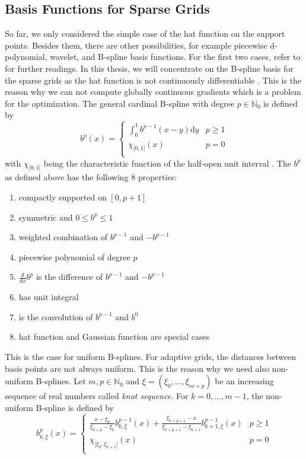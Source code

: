 \subsection{Basis Functions for Sparse Grids}

So far, we only considered the simple case of the hat function on the support points. Besides them, there are other possibilities, for example piecewise d-polynomial, wavelet, and B-spline basis functions. For the first two cases, refer to \cite{pfluger2010spatially, bungartz1998finite, bungartz2004sparse} for further readings. In this thesis, we will concentrate on the B-spline basis for the sparse grids as the hat function is not continuously differentiable \cite{b_splines}. This is the reason why we can not compute globally continuous gradients which is a problem for the optimization. The general cardinal B-spline with degree $ p \in \mathbb{N}_0 $ is defined by 
\begin{equation}
	b^p(x) = \begin{cases} 
				\int_0^1 b^{p-1}(x-y) \text{d}y				& p \geq 1 \\
				\chi_{[0,1[}(x) 							& p=0 \\
			\end{cases}
\end{equation}
with $ \chi_{[0,1[} $ being the characteristic function of the half-open unit interval \cite{hollig2013approximation}. The $ b^p $ as defined above has the following 8 properties:

\begin{enumerate}
	\item compactly supported on $ [0, p+1] $
	\item symmetric and $ 0 \le b^p \le 1 $
	\item weighted combination of $ b^{p-1} $ and $ -b^{p-1} $
	\item piecewise polynomial of degree $ p $
	\item $ \frac{d}{dx} b^p $ is the difference of $ b^{p-1} $ and $ -b^{p-1} $
	\item has unit integral 
	\item is the convolution of $ b^{p-1} $ and $ b^{0} $
	\item hat function and Gaussian function are special cases
\end{enumerate}

This is the case for uniform B-splines. For adaptive grids, the distances between basis points are not always uniform. This is the reason why we need also non-uniform B-splines. Let $ m, p \in \mathbb{N}_0 $ and $ \xi = \left(\xi_0, ... , \xi_{m+p}\right) $ be an increasing sequence of real numbers called \textit{knot sequence}. For $ k=0,..., m-1 $, the non-uniform B-spline is defined by 
\begin{equation}
	b^p_{k,\xi}(x) = \begin{cases} 
		\frac{x-\xi_k}{\xi_{k+p}-\xi_k}b^{p-1}_{k,\xi}(x) + \frac{\xi_{k+p+1}-x}{\xi_{k+p+1}-\xi_{k+1}}b^{p-1}_{k+1,\xi}(x)				& p \geq 1 \\
		\chi_{[\xi_{k},\xi_{k+1}[}(x) 							& p=0 \\
	\end{cases}
\end{equation}

